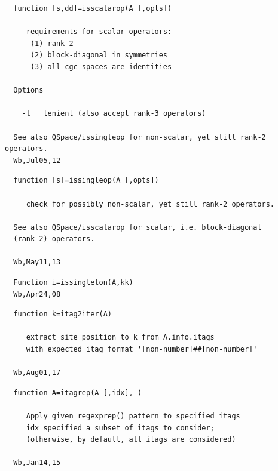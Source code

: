 \documentclass[twoside,12pt]{article}
\begin{document}
\pagebreak[3]



\begin{verbatim}
  function [s,dd]=isscalarop(A [,opts])
 
     requirements for scalar operators:
      (1) rank-2
      (2) block-diagonal in symmetries
      (3) all cgc spaces are identities
 
  Options
 
    -l   lenient (also accept rank-3 operators)
 
  See also QSpace/issingleop for non-scalar, yet still rank-2 operators.
  Wb,Jul05,12
\end{verbatim}

\pagebreak[3]



\begin{verbatim}
  function [s]=issingleop(A [,opts])
 
     check for possibly non-scalar, yet still rank-2 operators.
 
  See also QSpace/isscalarop for scalar, i.e. block-diagonal
  (rank-2) operators.
 
  Wb,May11,13
\end{verbatim}

\pagebreak[3]



\begin{verbatim}
  Function i=issingleton(A,kk)
  Wb,Apr24,08
\end{verbatim}

\pagebreak[3]



\begin{verbatim}
  function k=itag2iter(A)
 
     extract site position to k from A.info.itags
     with expected itag format '[non-number]##[non-number]'
 
  Wb,Aug01,17
\end{verbatim}

\pagebreak[3]



\begin{verbatim}
  function A=itagrep(A [,idx], )
 
     Apply given regexprep() pattern to specified itags
     idx specified a subset of itags to consider;
     (otherwise, by default, all itags are considered)
 
  Wb,Jan14,15
\end{verbatim}
\end{document}
